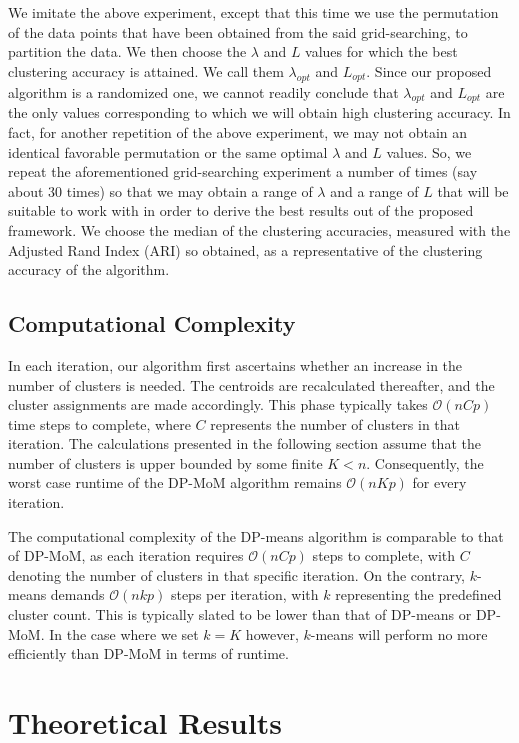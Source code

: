 \documentclass[11pt]{article}
\begin{document}
We imitate the above experiment, except that this time we use the permutation of the data points that have been obtained from the said grid-searching, to partition the data. We then choose the $\lambda$ and $L$ values for which the best clustering accuracy is attained. We call them $\lambda_{opt}$ and $L_{opt}$. Since our proposed algorithm is a randomized one, we cannot readily conclude that $\lambda_{opt}$ and $L_{opt}$ are the only values corresponding to which we will obtain high clustering accuracy. In fact, for another repetition of the above experiment, we may not obtain an identical favorable permutation or the same optimal $\lambda$ and $L$ values. So, we repeat the aforementioned grid-searching experiment a number of times (say about 30 times) so that we may obtain a range of $\lambda$ and a range of $L$ that will be suitable to work with in order to derive the best results out of the proposed framework. We choose the median of the clustering accuracies, measured with the Adjusted Rand Index (ARI) \citep{Hubert1985} so obtained, as a representative of the clustering accuracy of the algorithm.

\subsection{Computational Complexity}
In each iteration, our algorithm first ascertains whether an increase in the number of clusters is needed. The centroids are recalculated thereafter, and the cluster assignments are made accordingly. This phase typically takes $\mathcal{O}(nCp)$ time steps to complete, where $C$ represents the number of clusters in that iteration. The calculations presented in the following section assume that the number of clusters is upper bounded by some finite $K<n$. Consequently, the worst case runtime of the DP-MoM algorithm remains $\mathcal{O}(nKp)$ for every iteration.

The computational complexity of the DP-means algorithm is comparable to that of DP-MoM, as each iteration requires $\mathcal{O}(nCp)$ steps to complete, with $C$ denoting the number of clusters in that specific iteration. On the contrary, $k$-means demands $\mathcal{O}(nkp)$ steps per iteration, with $k$ representing the predefined cluster count. This is typically slated to be lower than that of DP-means or DP-MoM. In the case where we set $k=K$ however, $k$-means will perform no more efficiently than DP-MoM in terms of runtime.


\section{Theoretical Results}
\label{sec:theory}
\end{document}
